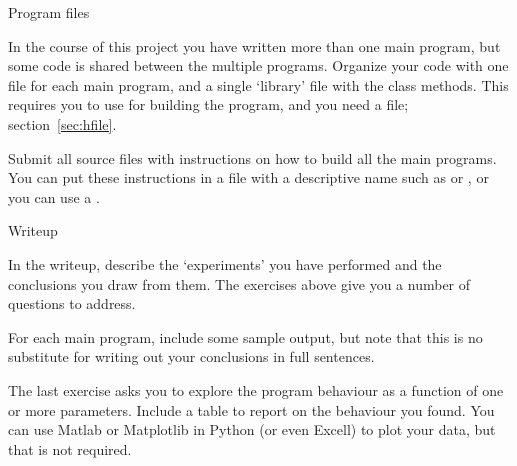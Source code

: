  {Program files}

In the course of this project you have written more than one main
program, but some code is shared between the multiple programs.
Organize your code with one file for each main program, and a single
`library' file with the class methods. This requires you to use
 for building the program, and you
need a  file; section~\ref{sec:hfile}.

Submit all source files with instructions on how to build all the main
programs. You can put these instructions in a file with a descriptive
name such as  or , or you can use a
.

 {Writeup}

In the writeup, describe the `experiments' you have performed and the
conclusions you draw from them. The exercises above give you a number
of questions to address.

For each main program, include some sample output, but note that this
is no substitute for writing out your conclusions in full sentences.

The last exercise asks you to explore the program behaviour as a
function of one or more parameters. Include a table to report on the
behaviour you found. You can use Matlab or Matplotlib in Python (or
even Excell) to plot your data, but that is not required.

\endinput

\begin{exercise}
  You can make the model more realistic by letting vaccination be
  only partly effective. For instance, 50\% of people got the flu
  vaccine, but it was only 40\% effective; 90\%~of people have the
  measles vaccine, and it is about 97\%
  effective. (\url{https://www.cdc.gov/nchs/fastats/immunize.htm}) How
  does your model function in this case? Keep in mind that different
  diseases have different degrees of infectuousness
  (\url{https://en.wikipedia.org/wiki/Basic_reproduction_number}).
\end{exercise}
